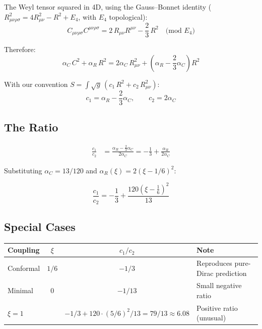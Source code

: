 \documentclass[11pt,a4paper]{article}
\begin{document}
The Weyl tensor squared in 4D, using the Gauss--Bonnet identity
($R_{\mu\nu\rho\sigma}^2 = 4R_{\mu\nu}^2 - R^2 + E_4$, with $E_4$ topological):
\begin{equation}
  C_{\mu\nu\rho\sigma}C^{\mu\nu\rho\sigma} = 2\,R_{\mu\nu}R^{\mu\nu} - \frac{2}{3}\,R^2
  \quad \text{(mod $E_4$)}
\end{equation}

Therefore:
\begin{equation}
  \alpha_C\,C^2 + \alpha_R\,R^2
  = 2\alpha_C\,R_{\mu\nu}^2 + \left(\alpha_R - \frac{2}{3}\alpha_C\right)R^2
\end{equation}

With our convention $S = \int\!\sqrt{g}\,(c_1\,R^2 + c_2\,R_{\mu\nu}^2)$:
\begin{equation}
  c_1 = \alpha_R - \frac{2}{3}\alpha_C, \qquad c_2 = 2\alpha_C
  \label{eq:c1c2-def}
\end{equation}

\subsection{The Ratio}

\begin{align}
  \frac{c_1}{c_2} &= \frac{\alpha_R - \frac{2}{3}\alpha_C}{2\alpha_C}
  = -\frac{1}{3} + \frac{\alpha_R}{2\alpha_C}
\end{align}

Substituting $\alpha_C = 13/120$ and $\alpha_R(\xi) = 2(\xi - 1/6)^2$:

\begin{equation}
  \boxed{
    \frac{c_1}{c_2} = -\frac{1}{3} + \frac{120\!\left(\xi - \tfrac{1}{6}\right)^{\!2}}{13}
  }
  \label{eq:c1c2-ratio}
\end{equation}

\subsection{Special Cases}

\begin{center}
\renewcommand{\arraystretch}{1.3}
\begin{tabular}{lccl}
  \toprule
  \textbf{Coupling} & $\xi$ & $c_1/c_2$ & \textbf{Note} \\
  \midrule
  Conformal & $1/6$ & $-1/3$ & Reproduces pure-Dirac prediction \\
  Minimal   & $0$   & $-1/13$ & Small negative ratio \\
  $\xi = 1$ &       & $-1/3 + 120 \cdot (5/6)^2/13 = 79/13 \approx 6.08$ & Positive ratio (unusual) \\
  \bottomrule
\end{tabular}
\end{center}
\end{document}
